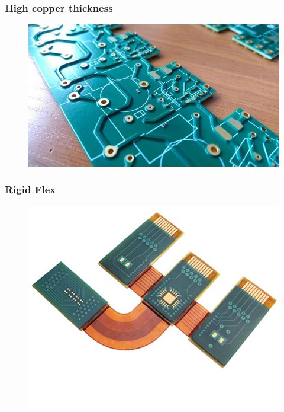 \documentclass[t]{beamer}
\begin{document}
\begin{frame}
	\frametitle{High copper thickness}
	\begin{figure}
		\includegraphics[width=\linewidth]{20ozCu.jpg}
	\end{figure}
\end{frame}
\begin{frame}
	\frametitle{Rigid Flex}
	\begin{figure}
		\includegraphics[width=\linewidth]{rigidFlex.jpg}
	\end{figure}
\end{frame}
\end{document}
